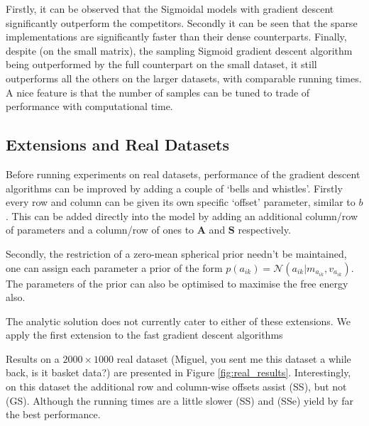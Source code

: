 \documentclass{article}
\newcommand{\A}{\mathbf{A}}
\newcommand{\s}{\mathbf{S}}
\newcommand{\N}{\mathcal{N}}
\begin{document}
Firstly, it can be observed that the Sigmoidal models with gradient descent significantly outperform the competitors. Secondly it can be seen that the sparse implementations are significantly faster than their dense counterparts. Finally, despite (on the small matrix), the sampling Sigmoid gradient descent algorithm 
being outperformed by the full counterpart on the small dataset, 
it still outperforms all the others on the larger datasets, with comparable running times.
A nice feature is that the number of samples can be tuned to trade of performance with computational time.

\subsection{Extensions and Real Datasets}

Before running experiments on real datasets, performance of the gradient descent algorithms can
be improved by adding a couple of `bells and whistles'.
Firstly every row and column can be given its own specific `offset' parameter, similar to $b$.
This can be added directly into the model by adding an additional column/row of parameters and
a column/row of ones to $\A$ and $\s$ respectively.

Secondly, the restriction of a zero-mean spherical prior needn't be maintained,
one can assign each parameter a prior of the form $p(a_{ik})=\N(a_{ik}|m_{a_{ik}},v_{a_{ik}})$.
The parameters of the prior can also be optimised to maximise the free energy also.

The analytic solution does not currently cater to either of these extensions.
We apply the first extension to the fast gradient descent algorithms

Results on a $2000\times 1000$ real dataset (Miguel, you sent me this dataset a while back, 
is it basket data?) are presented in Figure \eqref{fig:real_results}. 
Interestingly, on this dataset the additional row and column-wise offsets assist (SS), but not
(GS). Although the running times are a little slower (SS) and (SSe) 
yield by far the best performance.
\end{document}
